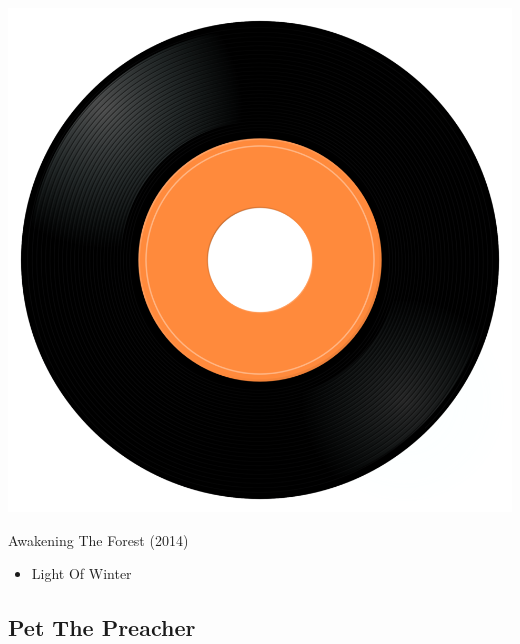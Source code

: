 \begin{minipage}[t]{0.25\textwidth}\vspace{0pt}
\captionsetup{type=figure}
\includegraphics[width=\textwidth]{Images/cover.png}
\caption*{Awakening The Forest (2014)}
\end{minipage}
\begin{minipage}[t]{0.25\textwidth}\vspace{0pt}
\begin{itemize}[nosep,leftmargin=1em,labelwidth=*,align=left]
	\setlength{\itemsep}{0pt}
	\item Light Of Winter
\end{itemize}
\end{minipage}

\subsection{Pet The Preacher}

